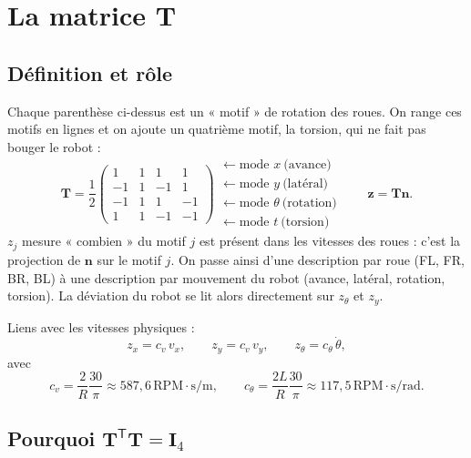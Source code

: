 \documentclass[11pt,a4paper]{article}
\newcommand{\SI}[2]{\ensuremath{#1\,\mathrm{#2}}}
\newcommand{\vect}[1]{\boldsymbol{#1}}
\newcommand{\T}{\mathsf{T}}
\newcommand{\Tm}{\vect{T}}
\begin{document}
\section{La matrice $\Tm$}

\subsection{Définition et rôle}

Chaque parenthèse ci-dessus est un « motif » de rotation des roues.
On range ces motifs en lignes et on ajoute un quatrième motif, la torsion, qui ne fait pas bouger le robot :
\begin{equation}
\Tm=\frac12
\begin{pmatrix}
 1 & 1 & 1 & 1\\
-1 & 1 &-1 & 1\\
-1 & 1 & 1 &-1\\
 1 & 1 &-1 &-1
\end{pmatrix}
\begin{array}{l}
\leftarrow \text{mode } x\ \text{(avance)}\\
\leftarrow \text{mode } y\ \text{(latéral)}\\
\leftarrow \text{mode } \theta\ \text{(rotation)}\\
\leftarrow \text{mode } t\ \text{(torsion)}
\end{array}
\qquad
\vect z=\Tm\vect n .
\end{equation}
$z_j$ mesure « combien » du motif $j$ est présent dans les vitesses des roues :
c'est la projection de $\vect n$ sur le motif $j$.
On passe ainsi d'une description par roue (FL, FR, BR, BL) à une description par mouvement du robot (avance, latéral, rotation, torsion).
La déviation du robot se lit alors directement sur $z_\theta$ et $z_y$.

Liens avec les vitesses physiques :
\begin{equation}
z_x=c_v\,v_x,\qquad z_y=c_v\,v_y,\qquad z_\theta=c_\theta\,\dot\theta,
\end{equation}
avec
\begin{equation}
c_v=\frac{2}{R}\frac{30}{\pi}\approx\SI{587{,}6}{RPM\cdot s/m},
\qquad
c_\theta=\frac{2L}{R}\frac{30}{\pi}\approx\SI{117{,}5}{RPM\cdot s/rad}.
\end{equation}

\subsection{Pourquoi $\Tm^\T\Tm=\vect I_4$}
\end{document}
